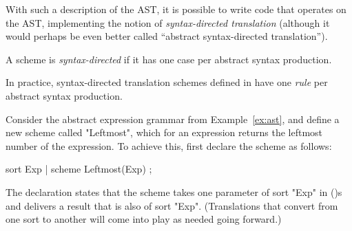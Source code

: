 \documentclass[12pt]{article} %
\begin{document}
With such a description of the AST, it is possible to write code that operates on the AST,
implementing the notion of \emph{syntax-directed translation} (although it would perhaps be even
better called ``abstract syntax-directed translation'').

\begin{definition}
  A scheme is \emph{syntax-directed} if it has one case per abstract syntax production.
\end{definition}

In practice, syntax-directed translation schemes defined in \HAX have one \emph{rule} per abstract
syntax production.

\begin{example}\label{ex:leftmost}
  Consider the abstract expression grammar from Example~\ref{ex:ast}, and define a new scheme called
  "Leftmost", which for an expression returns the leftmost number of the expression. To achieve
  this, first declare the scheme as follows:
  \begin{hacs}[xleftmargin=\parindent,xrightmargin=\parindent]
sort Exp | scheme Leftmost(Exp) ;
  \end{hacs}
  The declaration states that the scheme takes one parameter of sort "Exp" in ()s and delivers a
  result that is also of sort "Exp". (Translations that convert from one sort to another will come
  into play as needed going forward.)


\end{example}
\end{document}
